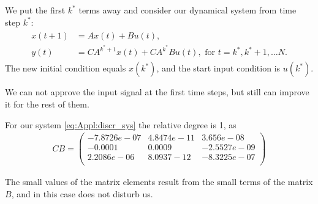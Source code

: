 We put the first $k^*$ terms away and consider our dynamical system from time step $k^*$:
\begin{align}
\begin{split}
x(t+1) &= A x(t) + B u(t), \\
y(t) &= C A^{k^* + 1}x(t) + C A^{k^*} B u(t),  \text{ for } t = k^*, k^* + 1, \dots N. 
\end{split}
\end{align}
The new initial condition equals $x(k^*)$, and the start input condition is $u(k^*)$. 

We can not approve the input signal at the first time steps, but still can improve it for the rest of them. 

\begin{exam}
For our system \eqref{eq:Appl:discr_sys} the relative degree is 1, as 
	\begin{align}
	CB = \begin{pmatrix}
	-7.8726e-07&	4.8474e-11&	3.656e-08\\
	-0.0001&	0.0009&		-2.5527e-09\\
	2.2086e-06&	8.0937-12&	-8.3225e-07\\
	\end{pmatrix}
	\end{align}

The small values of the matrix elements result from the small terms of the matrix $B$, and in this case does not disturb us.


\end{exam}
